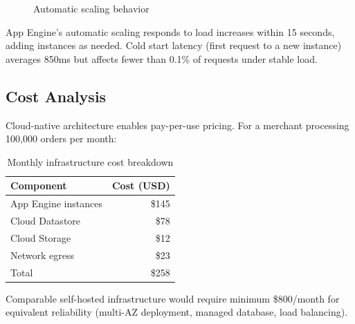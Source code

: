 \begin{figure}[h]
\centering
{}
\caption{Automatic scaling behavior}
\label{fig:scaling}
\end{figure}

App Engine's automatic scaling responds to load increases within 15 seconds, adding instances as needed. Cold start latency (first request to a new instance) averages 850ms but affects fewer than 0.1\% of requests under stable load.

\subsection{Cost Analysis}

Cloud-native architecture enables pay-per-use pricing. For a merchant processing 100,000 orders per month:

\begin{table}[h]
\centering
\caption{Monthly infrastructure cost breakdown}
\label{tab:cost}
\begin{tabular}{lr}
\hline
Component & Cost (USD) \\
\hline
App Engine instances & \$145 \\
Cloud Datastore & \$78 \\
Cloud Storage & \$12 \\
Network egress & \$23 \\
\hline
Total & \$258 \\
\hline
\end{tabular}
\end{table}

Comparable self-hosted infrastructure would require minimum \$800/month for equivalent reliability (multi-AZ deployment, managed database, load balancing).

